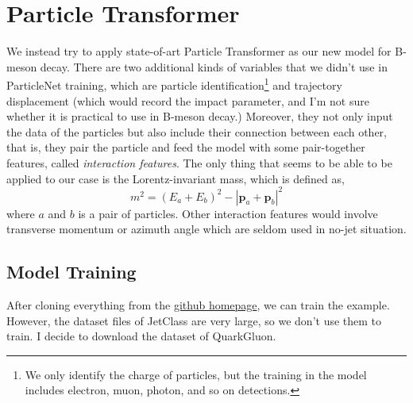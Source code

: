 \documentclass[12pt]{article}
\numberwithin{equation}{section}
\begin{document}
\section{Particle Transformer}
We instead try to apply state-of-art Particle Transformer\cite{Qu:2022mxj} as our new model for B-meson decay.
There are two additional kinds of variables that we didn't use in ParticleNet training, which are particle identification\footnote{We only identify the charge of particles, but the training in the model includes electron, muon, photon, and so on detections.} and trajectory displacement (which would record the impact parameter, and I'm not sure whether it is practical to use in B-meson decay.)
Moreover, they not only input the data of the particles but also include their connection between each other, that is, they pair the particle and feed the model with some pair-together features, called \textit{interaction features}.
The only thing that seems to be able to be applied to our case is the Lorentz-invariant mass, which is defined as,
\begin{equation}
    m^2 = (E_a + E_b)^2 - |\mathbf{p}_a + \mathbf{p}_b|^2
\end{equation}
where $a$ and $b$ is a pair of particles.
Other interaction features would involve transverse momentum or azimuth angle which are seldom used in no-jet situation.
\subsection{Model Training}
After cloning everything from the \href{https://github.com/jet-universe/particle_transformer}{github homepage}, we can train the example.
However, the dataset files of JetClass are very large, so we don't use them to train.
I decide to download the dataset of QuarkGluon.




\end{document}
